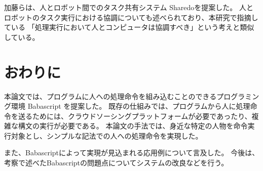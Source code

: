 \documentclass[twoside]{wiss}
\begin{document}
加藤らは、人とロボット間でのタスク共有システム Sharedoを提案した\cite{sharedo}。
人とロボットのタスク実行における協調についても述べられており、本研究で指摘している
「処理実行において人とコンピュータは協調すべき」という考えと類似している。

\section{おわりに}

本論文では、プログラムに人への処理命令を組み込むことのできるプログラミング環境 Babascript を提案した。
既存の仕組みでは、プログラムから人に処理命令を送るためには、クラウドソーシングプラットフォームが必要であったり、複雑な構文の実行が必要である。
本論文の手法では、身近な特定の人物を命令実行対象とし、シンプルな記法での人への処理命令を実現した。

また、Babascriptによって実現が見込まれる応用例について言及した。
今後は、考察で述べたBabascriptの問題点についてシステムの改良などを行う。

{\scriptsize


}
\end{document}
